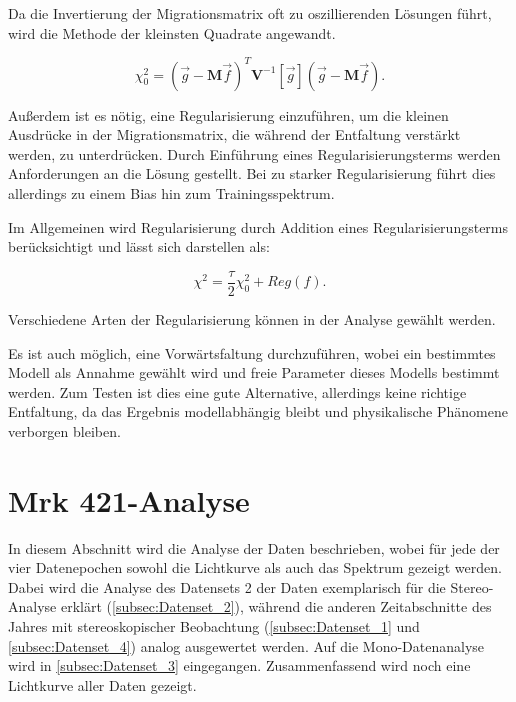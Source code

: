 Da die Invertierung der Migrationsmatrix oft zu oszillierenden Lösungen führt, wird die Methode der kleinsten Quadrate angewandt.

\begin{equation}
 \chi_0^2=(\vec{g}-\mathbf{M}\vec{f})^T \mathbf{V}^{-1}[\vec{g}](\vec{g}-\mathbf{M}\vec{f}).
\end{equation}

% 

Außerdem ist es nötig, eine Regularisierung einzuführen, um die kleinen Ausdrücke in der Migrationsmatrix, die während der Entfaltung verstärkt werden, zu unterdrücken.
Durch Einführung eines Regularisierungsterms werden Anforderungen an die Lösung gestellt.
Bei zu starker Regularisierung führt dies allerdings zu einem Bias hin zum Trainingsspektrum.

Im Allgemeinen wird Regularisierung durch Addition eines Regularisierungsterms berücksichtigt und lässt sich darstellen als:

\begin{equation}
 \chi^2=\frac{\tau}{2}\chi_0^2 + Reg(f).
\end{equation}

Verschiedene Arten der Regularisierung können in der Analyse gewählt werden.\cite{CombUnfold}

Es ist auch möglich, eine Vorwärtsfaltung durchzuführen, wobei ein bestimmtes Modell als Annahme gewählt wird und freie Parameter dieses Modells bestimmt werden.\cite{CombUnfold}
Zum Testen ist dies eine gute Alternative, allerdings keine richtige Entfaltung, da das Ergebnis modellabhängig bleibt und physikalische Phänomene verborgen bleiben.

\section{Mrk 421-Analyse}
\label{Mrk421_Analyse}
In diesem Abschnitt wird die Analyse der Daten beschrieben, wobei für jede der vier Datenepochen sowohl die Lichtkurve als auch das Spektrum gezeigt werden.
Dabei wird die Analyse des Datensets 2 der Daten exemplarisch für die Stereo-Analyse erklärt (\autoref{subsec:Datenset_2}), während die anderen Zeitabschnitte des Jahres mit stereoskopischer Beobachtung (\autoref{subsec:Datenset_1} und \autoref{subsec:Datenset_4}) analog ausgewertet werden.
Auf die Mono-Datenanalyse wird in \autoref{subsec:Datenset_3} eingegangen.
Zusammenfassend wird noch eine Lichtkurve aller Daten gezeigt.


